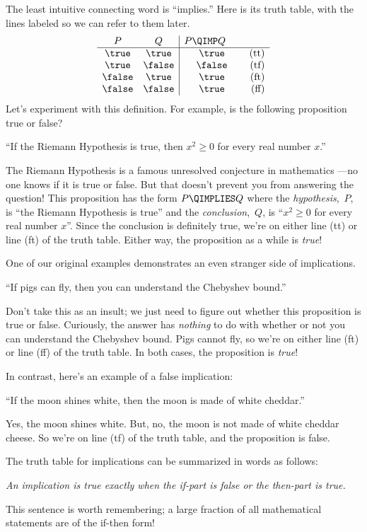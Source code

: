The least intuitive connecting word is ``implies.''  Here is its truth
table, with the lines labeled so we can refer to them later.
%
\[
\begin{array}{cc|cr}
    P  &   Q    & \parbox[b]{13ex}{$P \QIMP Q$} \\ \hline
\true  & \true  & \true & \text{(tt)}\\
\true  & \false & \false  & \text{(tf)}\\
\false & \true  & \true  & \text{(ft)}\\
\false & \false & \true  & \text{(ff)}
\end{array}
\]
Let's experiment with this definition.  For example, is the following
proposition true or false?
\begin{center}
``If the Riemann Hypothesis is true, then $x^2 \geq 0$ for every real
number $x$.''
\end{center}
The Riemann Hypothesis is a famous unresolved conjecture in
mathematics ---no one knows if it is true or false.  But that
doesn't prevent you from answering the question!  This proposition has
the form $P \QIMPLIES Q$ where the \emph{hypothesis},~$P$, is ``the
Riemann Hypothesis is true'' and the \emph{conclusion},~$Q$, is ``$x^2
\geq 0$ for every real number $x$''.  Since the conclusion is
definitely true, we're on either line (tt) or line (ft) of the truth
table.  Either way, the proposition as a while is \emph{true}!

One of our original examples demonstrates an even stranger side of
implications.
\begin{center}
``If pigs can fly, then you can understand the Chebyshev bound.''
\end{center}
Don't take this as an insult; we just need to figure out whether this
proposition is true or false.  Curiously, the answer has
\emph{nothing} to do with whether or not you can understand the
Chebyshev bound.  Pigs cannot fly, so we're on either line (ft) or
line (ff) of the truth table.  In both cases, the proposition is
\textit{true}!

In contrast, here's an example of a false implication:
%
\begin{center}
``If the moon shines white, then the moon is made of white cheddar.''
\end{center}
%
Yes, the moon shines white.  But, no, the moon is not made of white
cheddar cheese.  So we're on line (tf) of the truth table, and the
proposition is false.

The truth table for implications can be summarized in words as
follows:
%
\begin{center}
\textit{An implication is true exactly when the if-part is false or the
then-part is true.}
\end{center}
%
This sentence is worth remembering; a large fraction of all
mathematical statements are of the if-then form!

